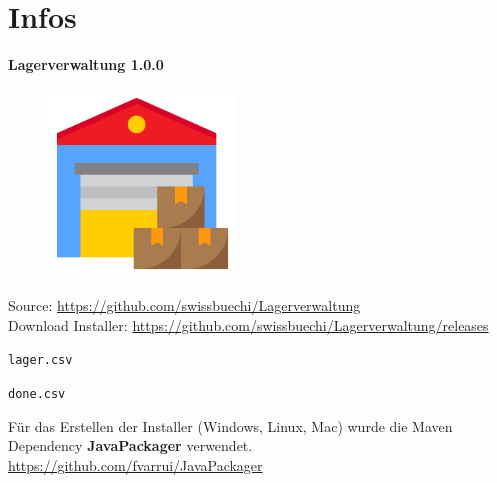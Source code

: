 \chapter{Infos}

\textbf{Lagerverwaltung 1.0.0}

\begin{figure}[h!]
    \includegraphics[width=5cm]{../src/main/resources/images/logo.png}
\end{figure}

Source: \url{https://github.com/swissbuechi/Lagerverwaltung} \\
Download Installer: \url{https://github.com/swissbuechi/Lagerverwaltung/releases}

\verb|lager.csv|



\verb|done.csv|



Für das Erstellen der Installer (Windows, Linux, Mac) wurde die Maven Dependency \textbf{JavaPackager} verwendet. \\
\url{https://github.com/fvarrui/JavaPackager}